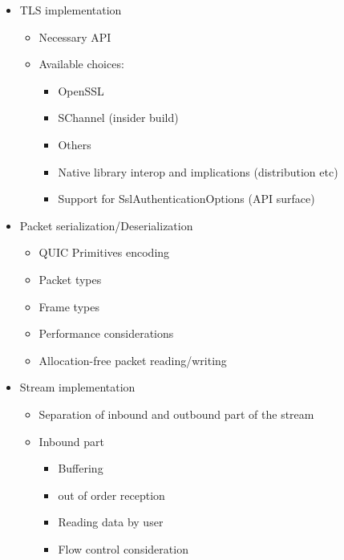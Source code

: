 \begin{itemize}
\begin{itemize}
    \end{itemize}

    \item TLS implementation

    \begin{itemize}

        \item Necessary API
        \item Available choices:
        \begin{itemize}

            \item OpenSSL
            \item SChannel (insider build)
            \item Others
            \item Native library interop and implications (distribution etc)
            \item Support for SslAuthenticationOptions (API surface)

        \end{itemize}
    \end{itemize}

    \item Packet serialization/Deserialization
    \begin{itemize}

        \item QUIC Primitives encoding
        \item Packet types
        \item Frame types
        \item Performance considerations
        \item Allocation-free packet reading/writing

    \end{itemize}

    \item Stream implementation
    \begin{itemize}

        \item Separation of inbound and outbound part of the stream
        \item Inbound part

        \begin{itemize}

            \item Buffering
            \item out of order reception
            \item Reading data by user
            \item Flow control consideration


\end{itemize}
\end{itemize}
\end{itemize}
